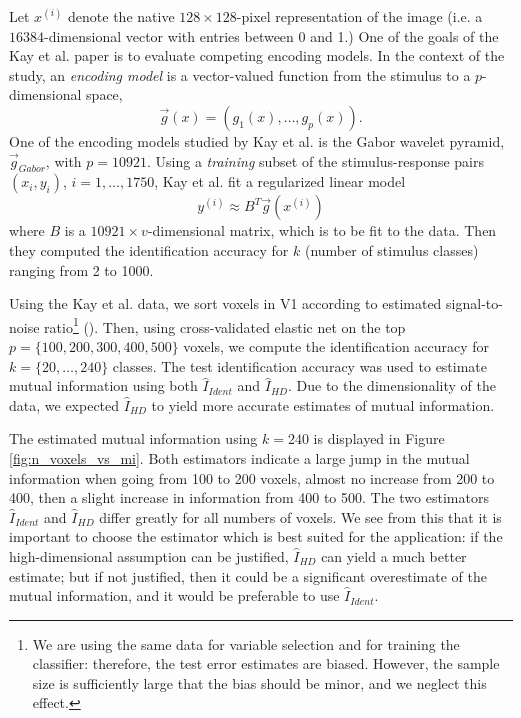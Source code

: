 Let $x^{(i)}$ denote the native $128 \times 128$-pixel representation
of the image (i.e. a $16384$-dimensional vector with entries between 0
and 1.)  One of the goals of the Kay et al. paper is to evaluate
competing encoding models.  In the context of the study,
an \emph{encoding model} is a vector-valued function from the stimulus
to a $p$-dimensional space,
\[
\vec{g}(x) = (g_1(x),\hdots, g_{p}(x)).
\]
One of the encoding models studied by Kay et al. is the Gabor wavelet pyramid,
$\vec{g}_{Gabor}$, with $p = 10921$.
Using a \emph{training} subset of the stimulus-response pairs $(x_i, y_i)$, $i = 1,\hdots, 1750$,
Kay et al. fit a regularized linear model
\[
y^{(i)} \approx B^T \vec{g}(x^{(i)})
\]
where $B$ is a $10921 \times v$-dimensional matrix, which is to be fit
to the data.  Then they computed the identification accuracy for $k$
(number of stimulus classes) ranging from 2 to 1000.

Using the Kay et al. data, we sort voxels in V1 according to estimated
signal-to-noise ratio\footnote{We are using the same data for variable
  selection and for training the classifier: therefore, the test error
  estimates are biased.  However, the sample size is sufficiently
  large that the bias should be minor, and we neglect this effect.}
(\cite{benjamini2013shuffle}).  Then, using cross-validated elastic
net on the top $p = \{100, 200, 300, 400, 500\}$ voxels, we compute
the identification accuracy for $k = \{20,\hdots, 240\}$ classes.  The
test identification accuracy was used to estimate mutual information
using both $\hat{I}_{Ident}$ and $\hat{I}_{HD}$.  Due to the
dimensionality of the data, we expected $\hat{I}_{HD}$ to yield more
accurate estimates of mutual information.

The estimated mutual information using $k = 240$ is displayed in
Figure \ref{fig:n_voxels_vs_mi}.  Both estimators indicate a large
jump in the mutual information when going from 100 to 200 voxels,
almost no increase from 200 to 400, then a slight increase in
information from 400 to 500.  The two estimators $\hat{I}_{Ident}$ and
$\hat{I}_{HD}$ differ greatly for all numbers of voxels. We see
from this that it is important to choose the estimator which is best
suited for the application: if the high-dimensional assumption can be
justified, $\hat{I}_{HD}$ can yield a much better estimate; but if not
justified, then it could be a significant overestimate of the mutual
information, and it would be preferable to use $\hat{I}_{Ident}$.

